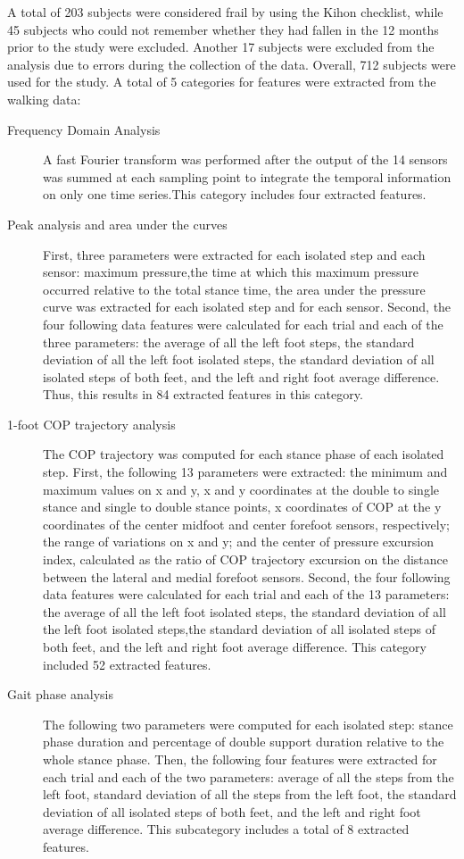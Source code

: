 A total of 203 subjects were considered frail by using the Kihon checklist, while 45 subjects who could not remember whether they had fallen in the 12 months prior to the study were excluded. Another 17 subjects were excluded from the analysis due to errors during the collection of the data. Overall, 712 subjects were used for the study. 
A total of 5 categories for features were extracted from the walking data:
\begin{description}
    \item[Frequency Domain Analysis] A fast Fourier transform was performed after the output of the 14 sensors was summed at each sampling point to integrate the temporal information on only one time series.This category includes four extracted features.
    \item[Peak analysis and area under the curves]First, three parameters were extracted for each isolated step and each sensor: maximum pressure,the time at which this maximum pressure occurred relative to the total stance time, the area under the pressure curve was extracted for each isolated step and for each sensor. Second, the four following data features were calculated for each trial and each of the three parameters: the average of all the left foot steps, the standard deviation of all the left foot isolated steps, the standard deviation of all isolated steps of both feet, and the left and right foot average difference. Thus, this results in 84 extracted features in this category.
    \item[1-foot COP trajectory analysis] The COP trajectory was computed for each stance phase of each isolated step. First, the following 13 parameters were extracted: the minimum and maximum values on x and y, x and y coordinates at the double to single stance and single to double stance points, x coordinates of COP at the y coordinates of the center midfoot and center forefoot sensors, respectively; the range of variations on x and y; and the center of pressure excursion index, calculated as the ratio of COP trajectory excursion on the distance between the lateral and medial forefoot sensors. Second, the four following data features were calculated for each trial and each of the 13 parameters: the average of all the left foot isolated steps, the standard deviation of all the left foot isolated steps,the standard deviation of all isolated steps of both feet, and the left and right foot average difference. This category included 52 extracted features.
    \item[Gait phase analysis] The following two parameters were computed for each isolated step: stance phase duration and percentage of double support duration relative to the whole stance phase. Then, the following four features were extracted for each trial and each of the two parameters: average of all the steps from the left foot, standard deviation of all the steps from the left foot, the standard deviation of all isolated steps of both feet, and the left and right foot average difference. This subcategory includes a total of 8 extracted features.

\end{description}
